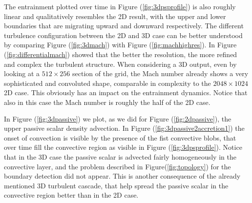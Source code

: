 The entrainment plotted over time in Figure (\ref{fig:3dpsprofile}) is also roughly linear and qualitatively resembles the 2D result, with the upper and lower boundaries that are migrating upward and downward respectively.
The different turbulence configuration between the 2D and 3D case can be better understood by comparing Figure (\ref{fig:3dmach}) with Figure (\ref{fig:machhighres}). In Figure (\ref{fig:differentialmach}) showed that the better the resolution, the more refined and complex the turbulent structure. When considering a 3D output, even by looking at a $512 \times 256$ section of the grid, the Mach number already shows a very sophisticated and convoluted shape, comparable in complexity to the $2048 \times 1024$ 2D case. This obviously has an impact on the entrainment dynamics. Notice that also in this case the Mach number is roughly the half of the 2D case. 


In Figure (\ref{fig:3dpassive}) we plot, as we did for Figure (\ref{fig:2dpassive}), the upper passive scalar density advection. In Figure (\ref{fig:3dpassive2accretion1}) the onset of convection is visible by the presence of the fist convective blobs, that over time fill the convective region as visible in Figure (\ref{fig:3dpsprofile}). Notice that in the 3D case the passive scalar is advected fairly homogeneously in the convective layer, and the problem described in Figure(\ref{fig:topology}) for the boundary detection did not appear. This is another consequence of the already mentioned 3D turbulent cascade, that help spread the passive scalar in the convective region better than in the 2D case.

